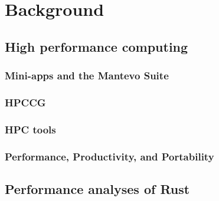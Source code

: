 \chapter{Background}
\label{ch:background}



\section{High performance computing}
\label{sec:hpc} %


\subsection{Mini-apps and the Mantevo Suite}
\label{ssec:mantevo} %


\subsection{HPCCG}
\label{ssec:hpccg} %


\subsection{HPC tools}
\label{ssec:hpc-tools} %


\subsection{Performance, Productivity, and Portability}
\label{ssec:p3hpc} %


\section{Performance analyses of Rust} %
\label{sec:related-work-rust-performance}
